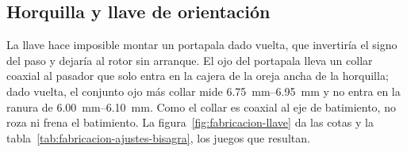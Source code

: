 \subsection{Horquilla y llave de orientación}\label{sec:fabricacion-llave}

La llave hace imposible montar un portapala dado vuelta, que invertiría el signo del paso
y dejaría al rotor sin arranque. El ojo del portapala lleva un collar coaxial al pasador
que solo entra en la cajera de la oreja ancha de la horquilla; dado vuelta, el conjunto
ojo más collar mide \SIrange{6.75}{6.95}{mm} y no entra en la ranura de
\SIrange{6.00}{6.10}{mm}. Como el collar es coaxial al eje de batimiento, no roza ni frena
el batimiento. La figura~\ref{fig:fabricacion-llave} da las cotas y la
tabla~\ref{tab:fabricacion-ajustes-bisagra}, los juegos que resultan.

